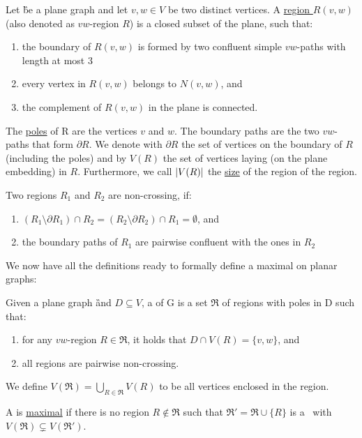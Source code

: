 
\begin{definition}
    Let \G be a plane graph and let $v,w \in V$ be two distinct vertices. A \underline{region $R(v,w)$} (also denoted as $vw$-region $R$) is a closed subset of the plane, such that:
    \begin{enumerate}
        \item the boundary of $R(v,w)$ is formed by two confluent simple $vw$-paths with length at most 3
        \item every vertex in $R(v,w)$ belongs to $N(v,w)$, and
        \item the complement of $R(v,w)$ in the plane is connected.
    \end{enumerate}
    
    The \underline{poles} of R are the vertices $v$ and $w$. 
    The boundary paths are the two $vw$-paths that form $\partial R$.
    We denote with $\partial R$ the set of vertices on the boundary of $R$ (including the poles) and by $V(R)$ the set of vertices laying (on the plane embedding) in $R$. 
    Furthermore, we call $\abs{V(R)}$ the \underline{size} of the region of the region.
    
\end{definition}

\begin{definition}
    Two regions $R_1$ and $R_2$ are non-crossing, if:
    \begin{enumerate}
        \item $(R_1 \setminus \partial R_1) \cap R_2 = (R_2 \setminus \partial R_2) \cap R_1 = \emptyset$, and
        \item the boundary paths of $R_1$ are pairwise confluent with the ones in $R_2$
    \end{enumerate}
\end{definition}

We now have all the definitions ready to formally define a maximal \dreg on planar graphs:

\begin{definition}\label{def:region}
    Given a plane graph \G and $D\subseteq V$, a \underline{\dreg} of G is a set $\mathfrak{R}$ of regions with poles in D such that: 
    \begin{enumerate}
        \item for any $vw$-region $R \in \mathfrak{R} $, it holds that $D \cap V(R) = \{v, w\}$, and
        \item all regions are pairwise non-crossing.
    \end{enumerate}
    We define $V(\mathfrak{R}) = \bigcup\limits_{R \in \mathfrak{R}} V(R)$ to be all vertices enclosed in the region. 
    
    \noindent A \dreg is \underline{maximal} if there is no region $R \notin \mathfrak{R}$ such that $\mathfrak{R}' = \mathfrak{R} \cup \{R\}$ is a \dreg~with $V(\mathfrak{R}) \subsetneq V(\mathfrak{R}')$.
\end{definition}

